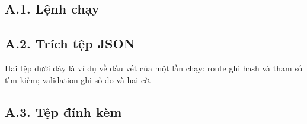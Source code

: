 \subsection*{A.1. Lệnh chạy}

\begin{code}[H]
  
  \caption{Các lệnh chạy từng giai đoạn và kiểm tra sau khi chạy.}
  \label{code:app-commands}
\end{code}

\begin{code}[H]
  
  \caption{Build image Gazebo và chạy quy trình trong container.}
  \label{code:app-docker}
\end{code}

\subsection*{A.2. Trích tệp JSON}

Hai tệp dưới đây là ví dụ về dấu vết của một lần chạy: route ghi hash và tham số
tìm kiếm; validation ghi số đo và hai cờ.

\begin{code}[H]
  
  \caption{Trích route JSON của lưới $3$ m. Trường \texttt{waypoints} được lược
    bỏ để giữ chỗ; các trường còn lại là nguyên văn.}
  \label{code:app-route}
\end{code}

\begin{code}[H]
  
  \caption{Trích validation JSON của G2 lưới $4$: số dòng telemetry, các sai số,
    tốc độ/gia tốc lớn nhất, SHA và hai cờ \texttt{valid}/\texttt{passed}.}
  \label{code:app-validation}
\end{code}

\subsection*{A.3. Tệp đính kèm}

